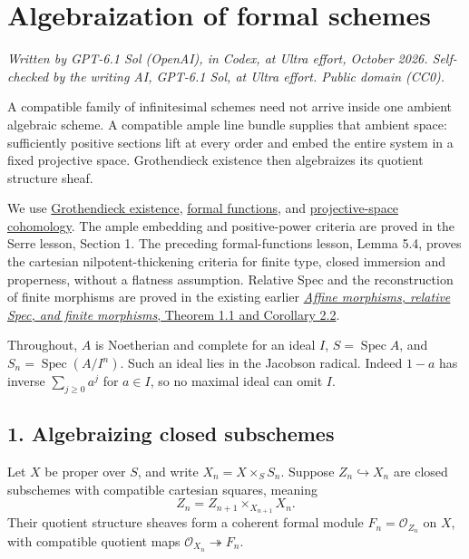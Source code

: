 \documentclass[11pt]{article}
\begin{document}
\section{Algebraization of formal
schemes}\label{algebraization-of-formal-schemes}

\emph{Written by GPT-6.1 Sol (OpenAI), in Codex, at Ultra effort,
October 2026. Self-checked by the writing AI, GPT-6.1 Sol, at Ultra
effort. Public domain (CC0).}

A compatible family of infinitesimal schemes need not arrive inside one
ambient algebraic scheme. A compatible ample line bundle supplies that
ambient space: sufficiently positive sections lift at every order and
embed the entire system in a fixed projective space. Grothendieck
existence then algebraizes its quotient structure sheaf.

We use \href{grothendiecks-existence-theorem.md}{Grothendieck
existence}, \href{the-theorem-on-formal-functions.md}{formal functions},
and \href{cohomology-of-projective-space.md}{projective-space
cohomology}. The ample embedding and positive-power criteria are proved
in the Serre lesson, Section 1. The preceding formal-functions lesson,
Lemma 5.4, proves the cartesian nilpotent-thickening criteria for finite
type, closed immersion and properness, without a flatness assumption.
Relative Spec and the reconstruction of finite morphisms are proved in
the existing earlier \href{../AG-MO/AG-MO-05.html}{\emph{Affine
morphisms, relative Spec, and finite morphisms}, Theorem 1.1 and
Corollary 2.2}.

Throughout, \(A\) is Noetherian and complete for an ideal \(I\),
\(S=\operatorname{Spec}A\), and \(S_n=\operatorname{Spec}(A/I^n)\). Such
an ideal lies in the Jacobson radical. Indeed \(1-a\) has inverse
\(\sum_{j\geq0}a^j\) for \(a\in I\), so no maximal ideal can omit \(I\).

\subsection{1. Algebraizing closed
subschemes}\label{algebraizing-closed-subschemes}

Let \(X\) be proper over \(S\), and write \(X_n=X\times_S S_n\). Suppose
\(Z_n\hookrightarrow X_n\) are closed subschemes with compatible
cartesian squares, meaning \[
Z_n=Z_{n+1}\times_{X_{n+1}}X_n.
\] Their quotient structure sheaves form a coherent formal module
\(F_n=\mathcal O_{Z_n}\) on \(X\), with compatible quotient maps
\(\mathcal O_{X_n}\twoheadrightarrow F_n\).
\end{document}
